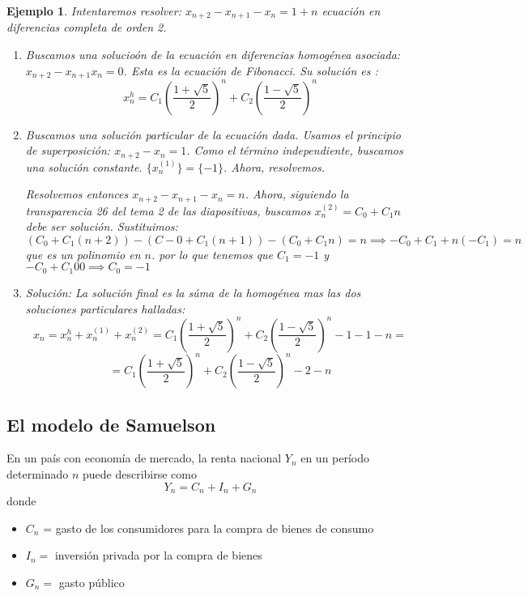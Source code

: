 \documentclass[11pt, a4paper, titlepage]{article}
\theoremstyle{theorem-style}
\theoremstyle{definition-style}
\theoremstyle{remark-style}
\theoremstyle{example-style}
\newtheorem*{ejemplo}{Ejemplo}
\begin{document}
\begin{ejemplo}
	Intentaremos resolver: $x _{n+2} - x _{n+1}  - x_n = 1+n$ ecuación en diferencias completa de orden 2.
	\begin{enumerate}
	\item Buscamos una solucioón de la ecuación en diferencias homogénea asociada: $x _{n+2} - x _{n+1} x_n = 0$. Esta es la ecuación de Fibonacci. Su solución es : $$x_n^h = C_1(\frac{1+ \sqrt 5}{2})^n + C_2 (\frac{1-\sqrt 5}{2})^n$$
	\item Buscamos una solución particular de la ecuación dada.  Usamos el principio de superposición: $x _{n+2} - x_n = 1$. Como el término independiente, buscamos una solución constante. $\{x_n^{(1)}\} = \{-1\}$. Ahora, resolvemos.
	
	Resolvemos entonces $x _{n+2} - x _{n+1} - x_n = n$. Ahora, siguiendo la transparencia 26 del tema 2 de las diapositivas, buscamos $x_n^{(2)} = C_0 + C_1 n$ debe ser solución. Sustituimos:
	\[
	(C_0 + C_1(n+2)) -(C-0 + C_1(n+1)) - (C_0 + C_1 n) = n \implies -C_0 + C_1 +n(-C_1) = n 
	\]
	que es un polinomio en $n$. por lo que tenemos que $C_1 = -1 $ y $-C_0 + C_1 0 0 \implies C_0 = -1$
	
	\item Solución: La solución final es la súma de la homogénea mas las dos soluciones particulares halladas:
	\[
	x_n = x_n^h + x_n^{(1)} +  x_n^{(2)} =  C_1(\frac{1+ \sqrt 5}{2})^n + C_2 (\frac{1-\sqrt 5}{2})^n -1-1-n = 
	\]
	\[
	=  C_1(\frac{1+ \sqrt 5}{2})^n + C_2 (\frac{1-\sqrt 5}{2})^n -2 - n
	\]
\end{enumerate}
\end{ejemplo}


\subsection{El modelo de Samuelson}

En un país con economía de mercado, la renta nacional $Y_{n}$ en un
        período determinado $n$ puede describirse como
        $$Y_{n} = C_{n} + I_{n} + G_{n}$$
        donde
        \begin{itemize}
        \item $C_{n}$ = gasto de los consumidores para la compra de bienes de
          consumo
        \item $I_{n} = $ inversión privada por la compra de bienes
        \item $G_{n} = $ gasto público
        \end{itemize}
\end{document}
